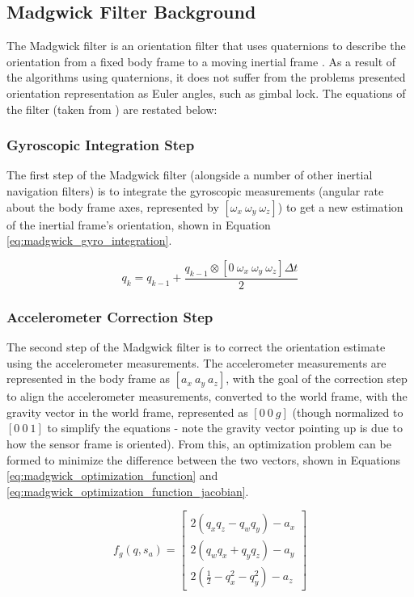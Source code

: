 \documentclass[bare_jrnl_transmag]{subfiles}
\begin{document}
\subsection{Madgwick Filter Background}
The Madgwick filter is an orientation filter that uses quaternions to describe the orientation from a fixed body frame to a moving inertial frame \cite{ahrs_madgwick}. As a result of the algorithms using quaternions, it does not suffer from the problems presented orientation representation as Euler angles, such as gimbal lock. The equations of the filter (taken from \cite{ahrs_madgwick}) are restated below:

\subsubsection{Gyroscopic Integration Step}
The first step of the Madgwick filter (alongside a number of other inertial navigation filters) is to integrate the gyroscopic measurements (angular rate about the body frame axes, represented by $[\omega_x \ \omega_y \ \omega_z]$) to get a new estimation of the inertial frame's orientation, shown in Equation \ref{eq:madgwick_gyro_integration}.

\begin{equation}
    q_{k} = q_{k-1} + \frac{q_{k-1} \otimes [0 \ \omega_x \ \omega_y \ \omega_z] \Delta t}{2}
    \label{eq:madgwick_gyro_integration}
\end{equation}

\subsubsection{Accelerometer Correction Step}
The second step of the Madgwick filter is to correct the orientation estimate using the accelerometer measurements. The accelerometer measurements are represented in the body frame as $[a_x \ a_y \ a_z]$, with the goal of the correction step to align the accelerometer measurements, converted to the world frame, with the gravity vector in the world frame, represented as $[0 \ 0 \ g]$ (though normalized to $[0 \ 0 \ 1]$ to simplify the equations - note the gravity vector pointing up is due to how the sensor frame is oriented). From this, an optimization problem can be formed to minimize the difference between the two vectors, shown in Equations \ref{eq:madgwick_optimization_function} and \ref{eq:madgwick_optimization_function_jacobian}.

\begin{equation}
f_g(q, s_a) =
\begin{bmatrix}
    2(q_x q_z - q_w q_y) - a_x \\
    2(q_w q_x + q_y q_z) - a_y \\
    2\left(\frac{1}{2} - q_x^2 - q_y^2\right) - a_z
    \end{bmatrix}
    \label{eq:madgwick_optimization_function}
\end{equation}
    
\end{document}
